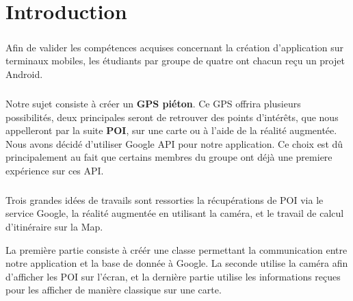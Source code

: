 \chapter*{Introduction}

\paragraph{}
Afin de valider les compétences acquises concernant la création d'application sur terminaux mobiles, les étudiants par groupe de quatre ont chacun reçu
un projet Android.

\paragraph{}
Notre sujet consiste à créer un \textbf{GPS piéton}. Ce GPS offrira plusieurs possibilités, deux principales
seront de retrouver des points d'intérêts, que nous appelleront par la suite \textbf{POI}, sur une carte ou à l'aide de la
réalité augmentée. Nous avons décidé d'utiliser Google API pour notre application. Ce choix est dû principalement au fait que certains 
membres du groupe ont déjà une premiere expérience sur ces API. 

\paragraph{}
Trois grandes idées de travails sont ressorties la récupérations de POI via le service Google, la réalité augmentée en utilisant la caméra, 
et le travail de calcul d'itinéraire sur la Map.

La première partie consiste à créér une classe permettant la communication entre notre application et la base de donnée à Google. La seconde utilise la
caméra afin d'afficher les POI sur l'écran, et la dernière partie utilise les informations reçues pour les afficher de manière classique sur une carte.
